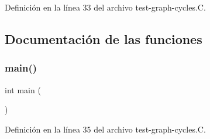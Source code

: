 Definición en la línea 33 del archivo test-\/graph-\/cycles.\+C.



\subsection{Documentación de las funciones}
\mbox{\label{test-graph-cycles_8_c_ae66f6b31b5ad750f1fe042a706a4e3d4}} 
\subsubsection{\texorpdfstring{main()}{main()}}
{\footnotesize\ttfamily int main (\begin{DoxyParamCaption}{ }\end{DoxyParamCaption})}



Definición en la línea 35 del archivo test-\/graph-\/cycles.\+C.


